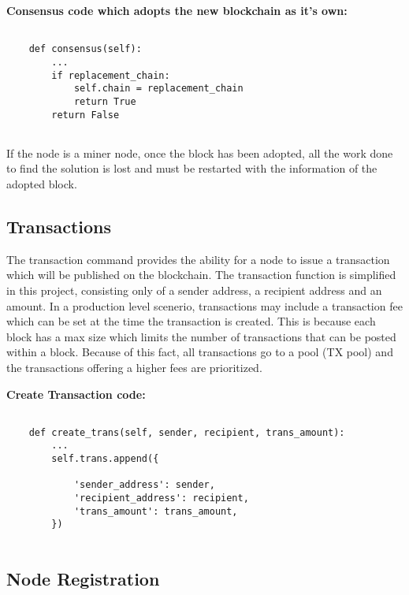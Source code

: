 \bigskip
\noindent
\textbf{Consensus code which adopts the new blockchain 
as it's own:}
\begin{footnotesize}
\begin{verbatim}

    def consensus(self):
        ...
	    if replacement_chain:
            self.chain = replacement_chain
            return True
        return False
	
\end{verbatim}
\end{footnotesize}

If the node is a miner node, once the block has been adopted, all the work done to find the solution is lost and must be restarted with the information of the adopted block.

\subsection{Transactions}

The transaction command provides the ability for a node to issue a transaction which will be 
published on the blockchain. The transaction function is simplified in this project, 
consisting only of a sender address, a recipient address and an amount. In a production level 
scenerio, transactions may include a transaction fee which can be set at the time the transaction is created. This is because each block has a max size which limits the number of transactions that can be posted within a block. Because of this fact, all transactions go to a pool (TX pool) and the transactions offering a higher fees are prioritized. 

\bigskip
\noindent
\textbf{Create Transaction code:}
\begin{footnotesize}
\begin{verbatim}

    def create_trans(self, sender, recipient, trans_amount):
        ...
        self.trans.append({

            'sender_address': sender,
            'recipient_address': recipient,
            'trans_amount': trans_amount,
        })
        
\end{verbatim}
\end{footnotesize}

\subsection{Node Registration}

